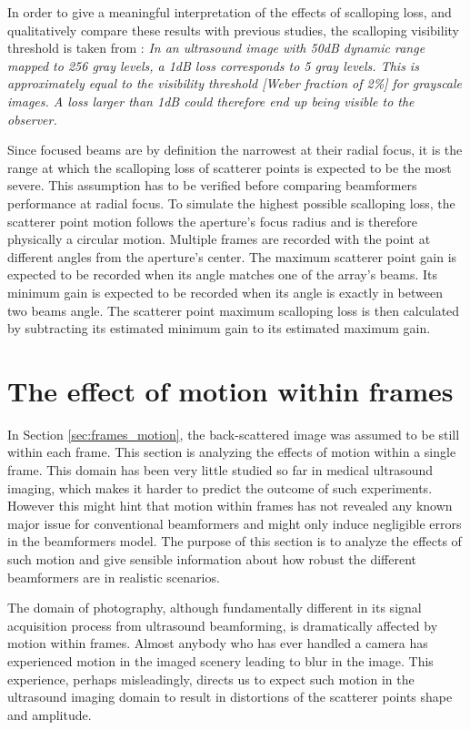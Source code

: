 In order to give a meaningful interpretation of the effects of scalloping loss, and qualitatively compare these results with previous studies, the scalloping visibility threshold is taken from \cite{Asen_shift_invariance}: \newline
\textit{In an ultrasound image with 50dB dynamic range mapped to 256 gray levels, a 1dB loss corresponds to 5 gray levels. This is approximately equal to the visibility threshold [Weber fraction of 2\%] for grayscale images. A loss larger than 1dB could therefore end up being visible to the observer.}

Since focused beams are by definition the narrowest at their radial focus, it is the range at which the scalloping loss of scatterer points is expected to be the most severe. This assumption has to be verified before comparing beamformers performance at radial focus.
To simulate the highest possible scalloping loss, the scatterer point motion follows the aperture's focus radius and is therefore physically a circular motion. Multiple frames are recorded with the point at different angles from the aperture's center. The maximum scatterer point gain is expected to be recorded when its angle matches one of the array's beams. Its minimum gain is expected to be recorded when its angle is exactly in between two beams angle. The scatterer point maximum scalloping loss is then calculated by subtracting its estimated minimum gain to its estimated maximum gain.


\section{The effect of motion within frames}
\label{sec:beams_motion}
In Section \ref{sec:frames_motion}, the back-scattered image was assumed to be still within each frame. This section is analyzing the effects of motion within a single frame. This domain has been very little studied so far in medical ultrasound imaging, which makes it harder to predict the outcome of such experiments. However this might hint that motion within frames has not revealed any known major issue for conventional beamformers and might only induce negligible errors in the beamformers model. The purpose of this section is to analyze the effects of such motion and give sensible information about how robust the different beamformers are in realistic scenarios.

The domain of photography, although fundamentally different in its signal acquisition process from ultrasound beamforming, is dramatically affected by motion within frames. Almost anybody who has ever handled a camera has experienced motion in the imaged scenery leading to blur in the image. This experience, perhaps misleadingly, directs us to expect such motion in the ultrasound imaging domain to result in distortions of the scatterer points shape and amplitude.

